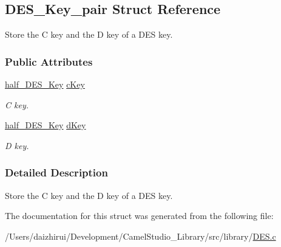 \hypertarget{a00107}{}\subsection{D\+E\+S\+\_\+\+Key\+\_\+pair Struct Reference}
\label{a00107}


Store the C key and the D key of a D\+ES key.  


\subsubsection*{Public Attributes}
\begin{DoxyCompactItemize}
\item 
\mbox{\label{a00107_a862bbf6fe679a2210435a2a033841cb2}} 
\mbox{\hyperlink{a00008_ab8c38437466ac99c5915b0bb855abf75}{half\+\_\+\+D\+E\+S\+\_\+\+Key}} \mbox{\hyperlink{a00107_a862bbf6fe679a2210435a2a033841cb2}{c\+Key}}
\begin{DoxyCompactList}\small\item\em C key. \end{DoxyCompactList}\item 
\mbox{\label{a00107_ac3d0076c7117a20e997b93ad1aac490c}} 
\mbox{\hyperlink{a00008_ab8c38437466ac99c5915b0bb855abf75}{half\+\_\+\+D\+E\+S\+\_\+\+Key}} \mbox{\hyperlink{a00107_ac3d0076c7117a20e997b93ad1aac490c}{d\+Key}}
\begin{DoxyCompactList}\small\item\em D key. \end{DoxyCompactList}\end{DoxyCompactItemize}


\subsubsection{Detailed Description}
Store the C key and the D key of a D\+ES key. 

The documentation for this struct was generated from the following file\+:\begin{DoxyCompactItemize}
\item 
/\+Users/daizhirui/\+Development/\+Camel\+Studio\+\_\+\+Library/src/library/\mbox{\hyperlink{a00008}{D\+E\+S.\+c}}\end{DoxyCompactItemize}
